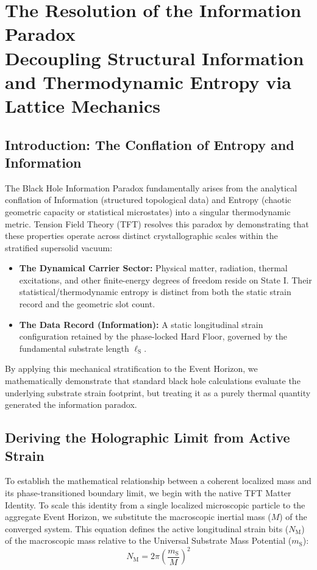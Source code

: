 \chapter[The Resolution of the Information Paradox]{The Resolution of the Information Paradox \\[0.2cm] \large Decoupling Structural Information and Thermodynamic Entropy via Lattice Mechanics}
\label{app:information_paradox}

\section{Introduction: The Conflation of Entropy and Information}

The Black Hole Information Paradox fundamentally arises from the analytical conflation of Information (structured topological data) and Entropy (chaotic geometric capacity or statistical microstates) into a singular thermodynamic metric. Tension Field Theory (TFT) resolves this paradox by demonstrating that these properties operate across distinct crystallographic scales within the stratified supersolid vacuum:

\begin{itemize}
    \item \textbf{The Dynamical Carrier Sector:} Physical matter, radiation, thermal excitations, and other finite-energy degrees of freedom reside on State I. Their statistical/thermodynamic entropy is distinct from both the static strain record and the geometric slot count.
    \item \textbf{The Data Record (Information):} A static longitudinal strain configuration retained by the phase-locked Hard Floor, governed by the fundamental substrate length $\ell_{\mathrm{S}}$.
\end{itemize}

By applying this mechanical stratification to the Event Horizon, we mathematically demonstrate that standard black hole calculations evaluate the underlying substrate strain footprint, but treating it as a purely thermal quantity generated the information paradox.

\section{Deriving the Holographic Limit from Active Strain}

To establish the mathematical relationship between a coherent localized mass and its phase-transitioned boundary limit, we begin with the native TFT Matter Identity. To scale this identity from a single localized microscopic particle to the aggregate Event Horizon, we substitute the macroscopic inertial mass ($M$) of the converged system. This equation defines the active longitudinal strain bits ($N_{\mathrm{M}}$) of the macroscopic mass relative to the Universal Substrate Mass Potential ($m_{\mathrm{S}}$):
\begin{equation}
    N_{\mathrm{M}} = 2\pi\left(\frac{m_{\mathrm{S}}}{M}\right)^2
\end{equation}

